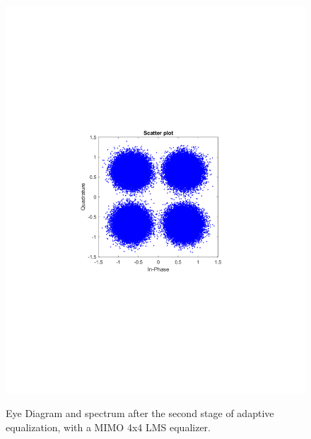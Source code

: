 \begin{refsection}
\begin{figure}[H]
\begin{minipage}{0.30\textwidth}
		\includegraphics[clip, trim=4cm 8cm 4cm 8cm, width=1\textwidth]{./sdf/m_qam_system/figures/expResults/intradyne/6_const_16GBdInSig13dB_AfMIMO2.pdf}
		\label{fig:16GBdSpecBefFec}
	\end{minipage}
	\caption{Eye Diagram and spectrum after the second stage of adaptive equalization, with a MIMO 4x4 LMS equalizer.}
\end{figure}


\end{refsection}
